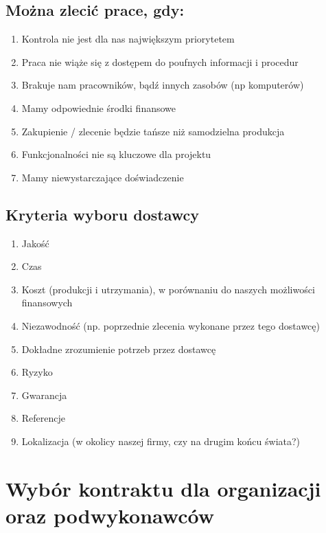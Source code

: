 \subsection*{Można zlecić prace, gdy:}
\begin{enumerate}
\item Kontrola nie jest dla nas największym priorytetem
\item Praca nie wiąże się z dostępem do poufnych informacji i procedur
\item Brakuje nam pracowników, bądź innych zasobów (np komputerów)
\item Mamy odpowiednie środki finansowe
\item Zakupienie / zlecenie będzie tańsze niż samodzielna produkcja
\item Funkcjonalności nie są kluczowe dla projektu
\item Mamy niewystarczające doświadczenie
\end{enumerate}

\subsection*{Kryteria wyboru dostawcy}
\begin{enumerate}
\item Jakość
\item Czas
\item Koszt (produkcji i utrzymania), w porównaniu do naszych możliwości finansowych
\item Niezawodność (np. poprzednie zlecenia wykonane przez tego dostawcę)
\item Dokładne zrozumienie potrzeb przez dostawcę
\item Ryzyko
\item Gwarancja
\item Referencje
\item Lokalizacja (w okolicy naszej firmy, czy na drugim końcu świata?)
\end{enumerate}

\clearpage


\section{Wybór kontraktu dla organizacji oraz podwykonawców}

